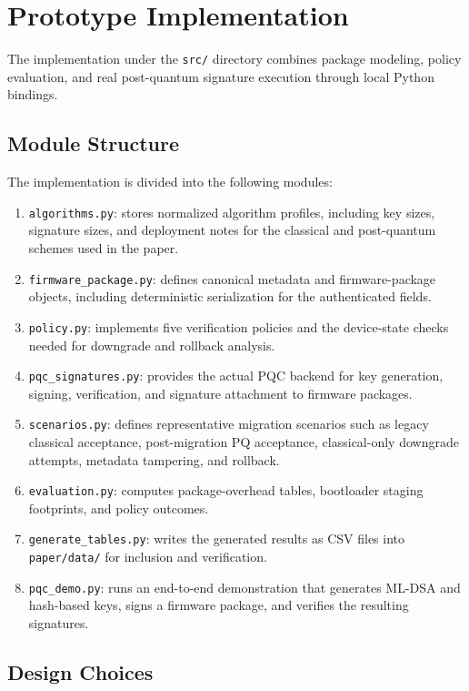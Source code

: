 \section{Prototype Implementation}

The implementation under the \texttt{src/} directory combines package modeling, policy evaluation, and real post-quantum signature execution through local Python bindings.

\subsection{Module Structure}

The implementation is divided into the following modules:
\begin{enumerate}
\item \texttt{algorithms.py}: stores normalized algorithm profiles, including key sizes, signature sizes, and deployment notes for the classical and post-quantum schemes used in the paper.
\item \texttt{firmware\_package.py}: defines canonical metadata and firmware-package objects, including deterministic serialization for the authenticated fields.
\item \texttt{policy.py}: implements five verification policies and the device-state checks needed for downgrade and rollback analysis.
\item \texttt{pqc\_signatures.py}: provides the actual PQC backend for key generation, signing, verification, and signature attachment to firmware packages.
\item \texttt{scenarios.py}: defines representative migration scenarios such as legacy classical acceptance, post-migration PQ acceptance, classical-only downgrade attempts, metadata tampering, and rollback.
\item \texttt{evaluation.py}: computes package-overhead tables, bootloader staging footprints, and policy outcomes.
\item \texttt{generate\_tables.py}: writes the generated results as CSV files into \texttt{paper/data/} for inclusion and verification.
\item \texttt{pqc\_demo.py}: runs an end-to-end demonstration that generates ML-DSA and hash-based keys, signs a firmware package, and verifies the resulting signatures.
\end{enumerate}

\subsection{Design Choices}

